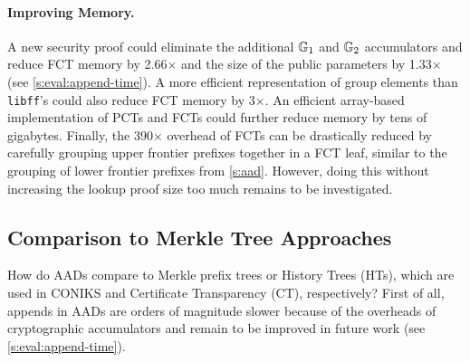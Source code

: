 \paragraph{Improving Memory.}
A new security proof could eliminate the additional $\mathbb{G}_1$ and $\mathbb{G}_2$ accumulators and reduce FCT memory by 2.66$\times$ and the size of the public parameters by 1.33$\times$ (see \cref{s:eval:append-time}).
A more efficient representation of group elements than \texttt{libff}'s could also reduce FCT memory by 3$\times$.
An efficient array-based implementation of PCTs and FCTs could further reduce memory by tens of gigabytes.
Finally, the 390$\times$ overhead of FCTs can be drastically reduced by carefully grouping upper frontier prefixes together in a FCT leaf, similar to the grouping of lower frontier prefixes from \cref{s:aad}.
However, doing this without increasing the lookup proof size too much remains to be investigated.

\subsection{Comparison to Merkle Tree Approaches}
\label{s:eval:comparison-to-merkle}

How do AADs compare to Merkle prefix trees or History Trees (HTs), which are used in CONIKS and Certificate Transparency (CT), respectively?
First of all, appends in AADs are orders of magnitude slower because of the overheads of cryptographic accumulators and remain to be improved in future work (see \cref{s:eval:append-time}).


